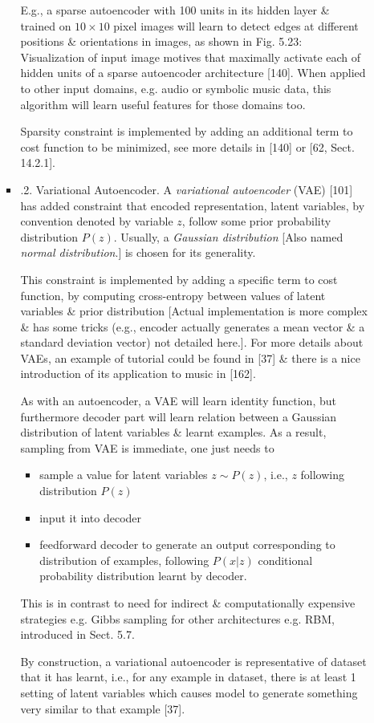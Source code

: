 \documentclass{article}
\begin{document}
\begin{itemize}
\begin{itemize}
\begin{itemize}
			E.g., a sparse autoencoder with 100 units in its hidden layer \& trained on $10\times10$ pixel images will learn to detect edges at different positions \& orientations in images, as shown in {\sf Fig. 5.23: Visualization of input image motives that maximally activate each of hidden units of a sparse autoencoder architecture [140].} When applied to other input domains, e.g. audio or symbolic music data, this algorithm will learn useful features for those domains too.

			Sparsity constraint is implemented by adding an additional term to cost function to be minimized, see more details in [140] or [62, Sect. 14.2.1].
			\item {.2. Variational Autoencoder.} A {\it variational autoencoder} (VAE) [101] has added constraint that encoded representation, latent variables, by convention denoted by variable $z$, follow some prior probability distribution $P(z)$. Usually, a {\it Gaussian distribution} [Also named {\it normal distribution}.] is chosen for its generality.

			This constraint is implemented by adding a specific term to cost function, by computing cross-entropy between values of latent variables \& prior distribution [Actual implementation is more complex \& has some tricks (e.g., encoder actually generates a mean vector \& a standard deviation vector) not detailed here.]. For more details about VAEs, an example of tutorial could be found in [37] \& there is a nice introduction of its application to music in [162].

			As with an autoencoder, a VAE will learn identity function, but furthermore decoder part will learn relation between a Gaussian distribution of latent variables \& learnt examples. As a result, sampling from VAE is immediate, one just needs to
			\begin{itemize}
				\item sample a value for latent variables $z\sim P(z)$, i.e., $z$ following distribution $P(z)$
				\item input it into decoder
				\item feedforward decoder to generate an output corresponding to distribution of examples, following $P(x|z)$ conditional probability distribution learnt by decoder.
			\end{itemize}
			This is in contrast to need for indirect \& computationally expensive strategies e.g. Gibbs sampling for other architectures e.g. RBM, introduced in Sect. 5.7.

			By construction, a variational autoencoder is representative of dataset that it has learnt, i.e., for any example in dataset, there is at least 1 setting of latent variables which causes model to generate something very similar to that example [37].


\end{itemize}
\end{itemize}
\end{itemize}
\end{document}

